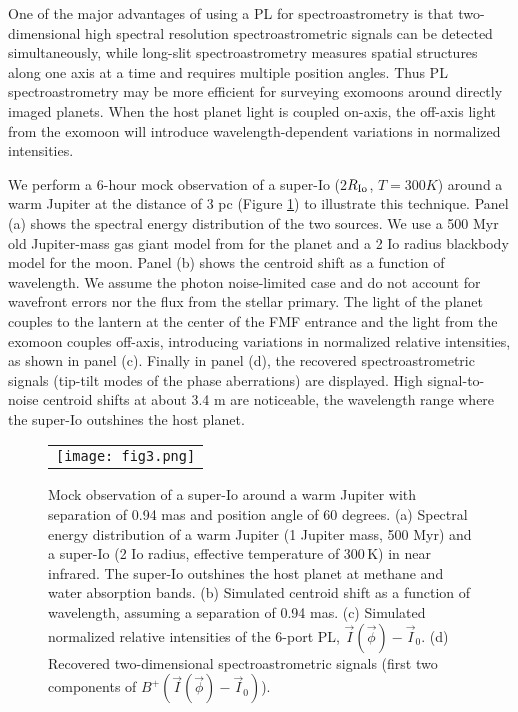 \documentclass[]{AO4ELT}  %
\begin{document}
One of the major advantages of using a PL for spectroastrometry is that two-dimensional high spectral resolution spectroastrometric signals can be detected simultaneously, while long-slit spectroastrometry measures spatial structures along one axis at a time and requires multiple position angles. Thus PL spectroastrometry may be more efficient for surveying exomoons around directly imaged planets. When the host planet light is coupled on-axis, the off-axis light from the exomoon will introduce wavelength-dependent variations in normalized intensities. 

We perform a 6-hour mock observation of a super-Io (2$R_{\rm Io}$, $T=300K$) around a warm Jupiter at the distance of 3 pc (Figure \ref{fig:exomoon}) to illustrate this technique. 
Panel (a) shows the spectral energy distribution of the two sources. We use a 500 Myr old Jupiter-mass gas giant model from \cite{spi12} for the planet and a 2 Io radius blackbody model for the moon. Panel (b) shows the centroid shift as a function of wavelength. We assume the photon noise-limited case and do not account for wavefront errors nor the flux from the stellar primary. The light of the planet couples to the lantern at the center of the FMF entrance and the light from the exomoon couples off-axis, introducing variations in normalized relative intensities, as shown in panel (c). Finally in panel (d), the recovered spectroastrometric signals (tip-tilt modes of the phase aberrations) are displayed. High signal-to-noise centroid shifts at about 3.4 \textmu m are noticeable, the wavelength range where the super-Io outshines the host planet.


\begin{figure} [hbt!]
\begin{center}
\begin{tabular}{c} 
\texttt{[image: fig3.png]}
\end{tabular}
\end{center}
\caption[example] 
{ \label{fig:exomoon} 
Mock observation of a super-Io around a warm Jupiter with separation of 0.94 mas and position angle of 60 degrees. (a) Spectral energy distribution of a warm Jupiter (1 Jupiter mass, 500 Myr) and a super-Io (2 Io radius, effective temperature of 300\,K) in near infrared. The super-Io outshines the host planet at methane and water absorption bands. (b) Simulated centroid shift as a function of wavelength, assuming a separation of 0.94 mas. (c) Simulated normalized relative intensities of the 6-port PL, $\vec{I}(\vec{\phi}) - \vec{I}_0$. (d) Recovered two-dimensional spectroastrometric signals (first two components of $B^{+} (\vec{I}(\vec{\phi}) - \vec{I}_0)$).}
\end{figure} 
\end{document}
